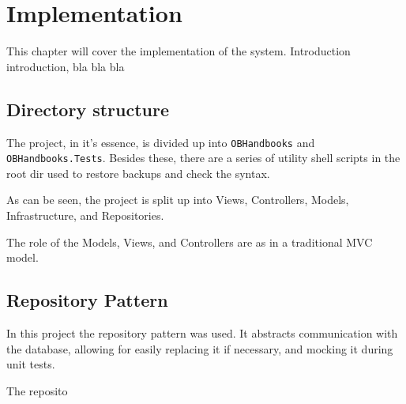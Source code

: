 \chapter{Implementation}
This chapter will cover the implementation of the system. Introduction introduction, bla bla bla
\section{Directory structure}
The project, in it's essence, is divided up into \texttt{OBHandbooks} and \texttt{OBHandbooks.Tests}. Besides these, there are a series of utility shell scripts in the root dir used to restore backups and check the syntax.

As can be seen, the project is split up into Views, Controllers, Models, Infrastructure, and Repositories.

The role of the Models, Views, and Controllers are as in a traditional MVC model.

\section{Repository Pattern}
In this project the repository pattern was used. It abstracts communication with the database, allowing for easily replacing it if necessary, and mocking it during unit tests.

The reposito
